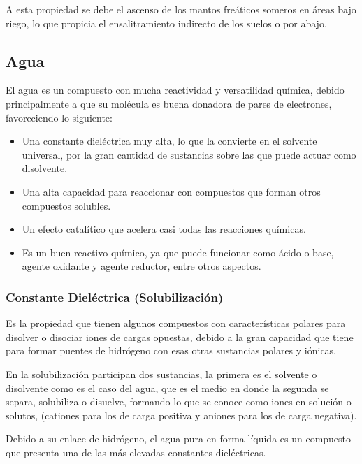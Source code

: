 A esta propiedad se debe el ascenso de los mantos freáticos someros en áreas bajo riego, lo que propicia el ensalitramiento indirecto de los suelos o por abajo.

\subsection{Agua}
El agua es un compuesto con mucha reactividad y versatilidad química, debido principalmente a que su molécula es buena donadora de pares de electrones, favoreciendo lo siguiente:
\begin{itemize}
  \item Una constante dieléctrica muy alta, lo que la convierte en el solvente universal, por la gran cantidad de sustancias sobre las que puede actuar como disolvente.
  \item Una alta capacidad para reaccionar con compuestos que forman otros compuestos solubles.
  \item Un efecto catalítico que acelera casi todas las reacciones químicas.
  \item Es un buen reactivo químico, ya que puede funcionar como ácido o base, agente oxidante y agente reductor, entre otros aspectos.
\end{itemize}
\subsubsection{Constante Dieléctrica (Solubilización)}
Es la propiedad que tienen algunos compuestos con características polares para disolver o disociar iones de cargas opuestas, debido a la gran capacidad que tiene para formar puentes de hidrógeno con esas otras sustancias polares y iónicas.

En la solubilización participan dos sustancias, la primera es el solvente o disolvente como es el caso del agua, que es el medio en donde la segunda se separa, solubiliza o disuelve, formando lo que se conoce como iones en solución o solutos, (cationes para los de carga positiva y aniones para los de carga negativa).

Debido a su enlace de hidrógeno, el agua pura en forma líquida es un compuesto que presenta una de las más elevadas constantes dieléctricas.

